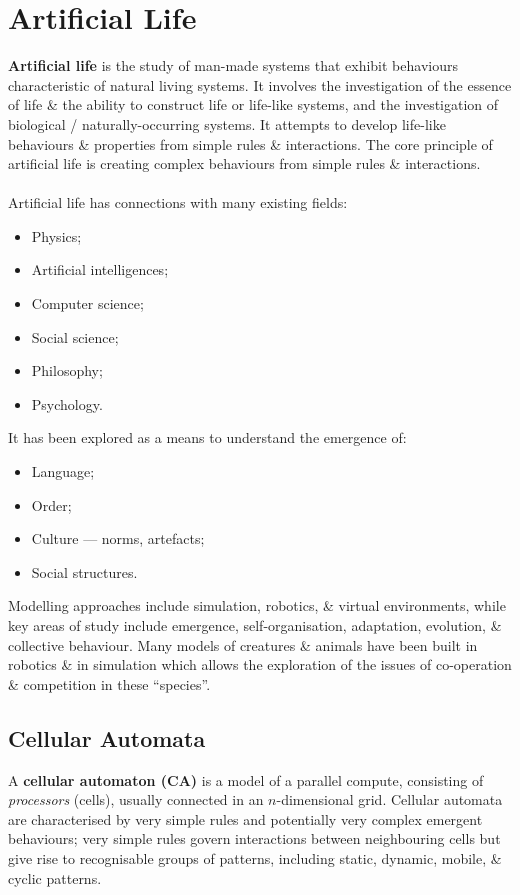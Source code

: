 \documentclass[a4paper,11pt]{article}
\begin{document}
\section{Artificial Life}
\textbf{Artificial life} is the study of man-made systems that exhibit behaviours characteristic of natural living systems.
It involves the investigation of the essence of life \& the ability to construct life or life-like systems, and the investigation of biological / naturally-occurring systems.
It attempts to develop life-like behaviours \& properties from simple rules \& interactions.
The core principle of artificial life is creating complex behaviours from simple rules \& interactions. 
\\\\
Artificial life has connections with many existing fields:
\begin{itemize}
    \item   Physics;
    \item   Artificial intelligences;
    \item   Computer science;
    \item   Social science;
    \item   Philosophy;
    \item   Psychology.
\end{itemize}

It has been explored as a means to understand the emergence of:
\begin{itemize}
    \item   Language;
    \item   Order;
    \item   Culture --- norms, artefacts;
    \item   Social structures.
\end{itemize}

Modelling approaches include simulation, robotics, \& virtual environments, while key areas of study include emergence, self-organisation, adaptation, evolution, \& collective behaviour.
Many models of creatures \& animals have been built in robotics \& in simulation which allows the exploration of the issues of co-operation \& competition in these ``species''.

\subsection{Cellular Automata}
A \textbf{cellular automaton (CA)} is a model of a parallel compute, consisting of \textit{processors} (cells), usually connected in an $n$-dimensional grid.
Cellular automata are characterised by very simple rules and potentially very complex emergent behaviours;
very simple rules govern interactions between neighbouring cells but give rise to recognisable groups of patterns, including static, dynamic, mobile, \& cyclic patterns.
\end{document}
